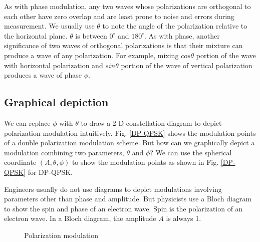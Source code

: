 \documentclass[oneside, letter, 12pt]{book}
\begin{document}
As with phase modulation, any two waves whose polarizations are orthogonal to each other have zero overlap and are least prone to noise and errors during measurement. We usually use $\theta$ to note the angle of the polarization relative to the horizontal plane. $\theta$ is between $0^\circ$ and $180^\circ$. As with phase, another significance of two waves of orthogonal polarizations is that their mixture can produce a wave of any polarization. For example, mixing $cos\theta$ portion of the wave with horizontal polarization and $sin\theta$ portion of the wave of vertical polarization produces a wave of phase $\phi$. 

\subsection{Graphical depiction}
We can replace $\phi$ with $\theta$ to draw a 2-D constellation diagram to depict polarization modulation intuitively. Fig. \ref{DP-QPSK} shows the modulation points of a double polarization modulation scheme. But how can we graphically depict a modulation combining two parameters, $\theta$ and $\phi$? We can use the spherical coordinate $(A, \theta, \phi)$ to show the modulation points as shown in Fig. \ref{DP-QPSK} for DP-QPSK.

Engineers usually do not use diagrams to depict modulations involving parameters other than phase and amplitude. But physicists use a Bloch diagram to show the spin and phase of an electron wave. Spin is the polarization of an electron wave. In a Bloch diagram, the amplitude $A$ is always 1.

\begin{figure}[ht]
\caption{Polarization modulation}
\label{PolarM}
\end{figure}
\end{document}
